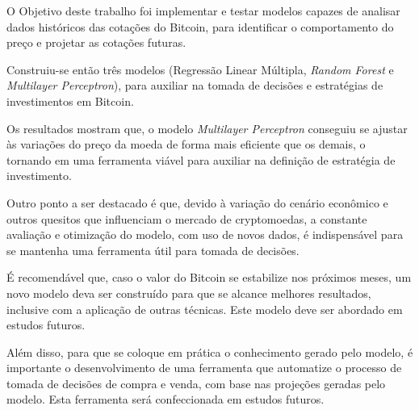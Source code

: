 \documentclass[12pt]{article}
\begin{document}
O Objetivo deste trabalho foi implementar e testar modelos capazes de analisar 
dados históricos das cotações do Bitcoin, para identificar o comportamento do 
preço e projetar as cotações futuras.

Construiu-se então três modelos (Regressão Linear Múltipla, \textit{Random Forest}
e \textit{Multilayer Perceptron}), para auxiliar na tomada de decisões e 
estratégias de investimentos em Bitcoin. 

Os resultados mostram que, o modelo \textit{Multilayer Perceptron} conseguiu se
ajustar às variações do preço da moeda de forma mais eficiente que os demais, 
o tornando em uma ferramenta viável para auxiliar na definição de estratégia de 
investimento.

Outro ponto a ser destacado é que, devido à variação do cenário econômico e outros
quesitos que influenciam o mercado de cryptomoedas, a constante avaliação e
otimização do modelo, com uso de novos dados, é indispensável para se mantenha
uma ferramenta útil para tomada de decisões.

É recomendável que, caso o valor do Bitcoin se estabilize nos próximos meses, um
novo modelo deva ser construído para que se alcance melhores resultados, inclusive
com a aplicação de outras técnicas. Este modelo deve ser abordado em estudos 
futuros.

Além disso, para que se coloque em prática o conhecimento gerado pelo modelo, é
importante o desenvolvimento de uma ferramenta que automatize o processo de 
tomada de decisões de compra e venda, com base nas projeções geradas pelo modelo.
Esta ferramenta será confeccionada em estudos futuros.

\clearpage



\end{document}
